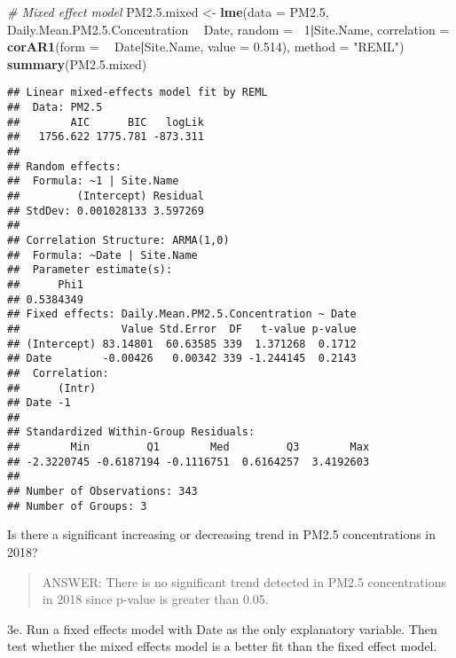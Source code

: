\documentclass[]{article}
\newenvironment{Shaded}{\begin{snugshade}}{\end{snugshade}}
\newcommand{\KeywordTok}[1]{\textcolor[rgb]{0.13,0.29,0.53}{\textbf{#1}}}
\newcommand{\DataTypeTok}[1]{\textcolor[rgb]{0.13,0.29,0.53}{#1}}
\newcommand{\DecValTok}[1]{\textcolor[rgb]{0.00,0.00,0.81}{#1}}
\newcommand{\FloatTok}[1]{\textcolor[rgb]{0.00,0.00,0.81}{#1}}
\newcommand{\StringTok}[1]{\textcolor[rgb]{0.31,0.60,0.02}{#1}}
\newcommand{\CommentTok}[1]{\textcolor[rgb]{0.56,0.35,0.01}{\textit{#1}}}
\newcommand{\OperatorTok}[1]{\textcolor[rgb]{0.81,0.36,0.00}{\textbf{#1}}}
\newcommand{\NormalTok}[1]{#1}
\begin{document}
\begin{Shaded}
\begin{Highlighting}[]
\CommentTok{# Mixed effect model}
\NormalTok{PM2.}\FloatTok{5.}\NormalTok{mixed <-}\StringTok{ }\KeywordTok{lme}\NormalTok{(}\DataTypeTok{data =}\NormalTok{ PM2.}\DecValTok{5}\NormalTok{,}
\NormalTok{                  Daily.Mean.PM2.}\FloatTok{5.}\NormalTok{Concentration }\OperatorTok{~}\StringTok{ }\NormalTok{Date, }
                  \DataTypeTok{random =} \OperatorTok{~}\DecValTok{1}\OperatorTok{|}\NormalTok{Site.Name,}
                  \DataTypeTok{correlation =} \KeywordTok{corAR1}\NormalTok{(}\DataTypeTok{form =} \OperatorTok{~}\StringTok{ }\NormalTok{Date}\OperatorTok{|}\NormalTok{Site.Name, }\DataTypeTok{value =} \FloatTok{0.514}\NormalTok{),}
                  \DataTypeTok{method =} \StringTok{"REML"}\NormalTok{)}
\KeywordTok{summary}\NormalTok{(PM2.}\FloatTok{5.}\NormalTok{mixed)}
\end{Highlighting}
\end{Shaded}

\begin{verbatim}
## Linear mixed-effects model fit by REML
##  Data: PM2.5 
##        AIC      BIC   logLik
##   1756.622 1775.781 -873.311
## 
## Random effects:
##  Formula: ~1 | Site.Name
##         (Intercept) Residual
## StdDev: 0.001028133 3.597269
## 
## Correlation Structure: ARMA(1,0)
##  Formula: ~Date | Site.Name 
##  Parameter estimate(s):
##      Phi1 
## 0.5384349 
## Fixed effects: Daily.Mean.PM2.5.Concentration ~ Date 
##                Value Std.Error  DF   t-value p-value
## (Intercept) 83.14801  60.63585 339  1.371268  0.1712
## Date        -0.00426   0.00342 339 -1.244145  0.2143
##  Correlation: 
##      (Intr)
## Date -1    
## 
## Standardized Within-Group Residuals:
##        Min         Q1        Med         Q3        Max 
## -2.3220745 -0.6187194 -0.1116751  0.6164257  3.4192603 
## 
## Number of Observations: 343
## Number of Groups: 3
\end{verbatim}

Is there a significant increasing or decreasing trend in PM2.5
concentrations in 2018?

\begin{quote}
ANSWER: There is no significant trend detected in PM2.5 concentrations
in 2018 since p-value is greater than 0.05.
\end{quote}

3e. Run a fixed effects model with Date as the only explanatory
variable. Then test whether the mixed effects model is a better fit than
the fixed effect model.
\end{document}
